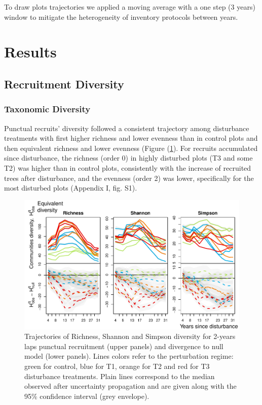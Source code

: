 \documentclass[fleqn,10pt]{ArtEcoFoG} %
\begin{document}
To draw plots trajectories we applied a moving average with a one step
(3 years) window to mitigate the heterogeneity of inventory protocols
between years.

\section{Results}\label{results}

\subsection{Recruitment Diversity}\label{recruitment-diversity}

\subsubsection{Taxonomic Diversity}\label{taxonomic-diversity}

Punctual recruits' diversity followed a consistent trajectory among
disturbance treatments with first higher richness and lower evenness
than in control plots and then equivalent richness and lower evenness
(Figure (\ref{fig:Fig1}). For recruits accumulated since disturbance,
the richness (order 0) in highly disturbed plots (T3 and some T2) was
higher than in control plots, consistently with the increase of
recruited trees after disturbance, and the evenness (order 2) was lower,
specifically for the most disturbed plots (Appendix I, fig. S1).

\begin{figure}

{\centering \includegraphics[width=0.8\linewidth]{RecruitmentTrajectories_files/figure-latex/Fig1-1} 

}

\caption{Trajectories of Richness, Shannon and Simpson diversity for 2-years laps punctual  recruitment (upper panels) and divergence to null model (lower panels). Lines colors refer to the perturbation regime: green for control, blue for T1, orange for T2 and red for T3 disturbance treatments. Plain lines correspond to the median observed after uncertainty propagation and are given along with the 95\% confidence interval (grey envelope).}\label{fig:Fig1}
\end{figure}
\end{document}

